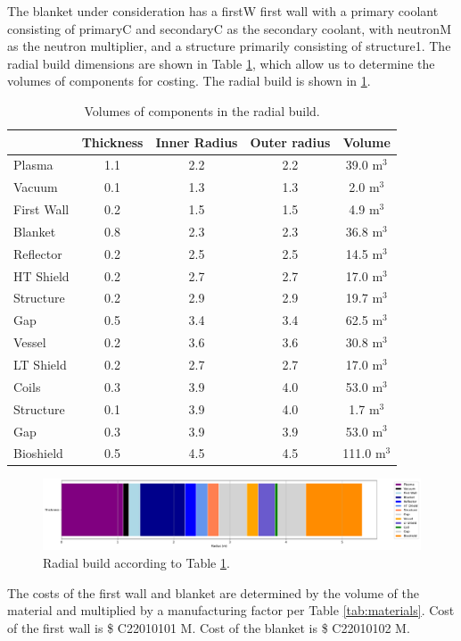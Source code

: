 The blanket under consideration has a firstW first wall with a primary coolant consisting of primaryC and secondaryC as the secondary coolant, with neutronM as the neutron multiplier, and a structure primarily consisting of structure1. The radial build dimensions are shown in Table \ref{tab:volumes}, which allow us to determine the volumes of components for costing.  The radial build is shown in \ref{fig:radial}.  \\


\begin{table}[h!]
    \centering
    \begin{tabular}{l c  c c c}
    \hline
        &	Thickness	&	Inner Radius	&	Outer radius	&	Volume		\\
        \hline
Plasma	&	1.1	&	2.2	&	2.2	&	39.0	m$^{3}$	\\
Vacuum	&	0.1	&	1.3	&	1.3	&	2.0	m$^{3}$	\\
First Wall	&	0.2	&	1.5	&	1.5	&	4.9	m$^{3}$	\\
Blanket	&	0.8	&	2.3	&	2.3	&	36.8	m$^{3}$	\\
Reflector	&	0.2	&	2.5	&	2.5	&	14.5	m$^{3}$	\\
HT Shield	&	0.2	&	2.7	&	2.7	&	17.0	m$^{3}$	\\
Structure	&	0.2	&	2.9	&	2.9	&	19.7	m$^{3}$	\\
Gap	&	0.5	&	3.4	&	3.4	&	62.5	m$^{3}$	\\
Vessel	&	0.2	&	3.6	&	3.6	&	30.8	m$^{3}$	\\
LT Shield	&	0.2	&	2.7	&	2.7	&	17.0	m$^{3}$	\\
Coils	&	0.3	&	3.9	&	4.0	&	53.0	m$^{3}$	\\
Structure	&	0.1	&	3.9	&	4.0	&	1.7	m$^{3}$	\\
Gap	&	0.3	&	3.9	&	3.9	&	53.0	m$^{3}$	\\
Bioshield	&	0.5	&	4.5	&	4.5	&	111.0	m$^{3}$	\\

        \hline
    \end{tabular}
    \caption{Volumes of components in the radial build.}
    \label{tab:volumes}
\end{table}

\begin{figure}
    \centering
    \includegraphics[width=0.9\linewidth]{Figures/radial_build.pdf}
    \caption{Radial build according to Table \ref{tab:volumes}.}
    \label{fig:radial}
\end{figure}



The costs of the first wall and blanket are determined by the volume of the material and multiplied by a manufacturing factor per Table \ref{tab:materials}.   Cost of the first wall is \$ C22010101 M.  Cost of the blanket is \$ C22010102 M.

